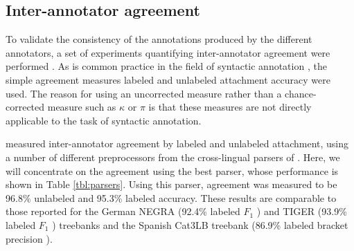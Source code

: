 \documentclass[10pt,a4paper]{article}
\begin{document}

%

\subsection{Inter-annotator agreement}
\label{sc:inter-a}
To validate the consistency of the annotations produced by the different
annotators, a set of experiments quantifying inter-annotator agreement were
performed \cite{Skjaerholt:13}. As is common practice in the field of
syntactic annotation \cite{Civit:ea:03,Brants:00,Bra:Han:02,Hajic:04}, the
simple agreement measures labeled and unlabeled attachment accuracy were
used. The reason for using an uncorrected measure rather than a
chance-corrected measure such as $\kappa$ or $\pi$ is that these measures are
not directly applicable to the task of syntactic annotation.

 measured inter-annotator agreement %
by labeled and unlabeled attachment, using a number of different preprocessors
from the cross-lingual parsers of . Here, we will
concentrate on the agreement using the best parser, whose performance is shown
in Table \ref{tbl:parsers}. Using this parser, agreement was measured to be
96.8\% unlabeled and 95.3\% labeled accuracy. These results are comparable
to those reported for the German NEGRA (92.4\% labeled
$F_1$ \cite{Brants:00}) and TIGER (93.9\% labeled $F_1$ \cite{Bra:Han:02})
treebanks and the Spanish Cat3LB treebank (86.9\% labeled bracket
precision \cite{Civit:ea:03}).
\end{document}
